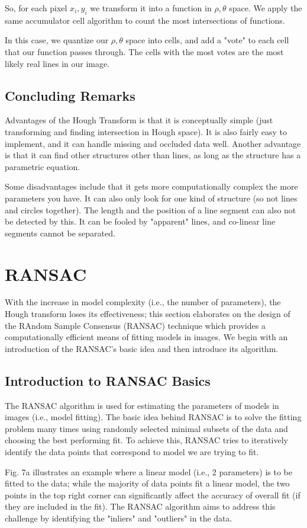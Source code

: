 \documentclass{article}
\begin{document}
So, for each pixel $x_i, y_i$ we transform it into a function in  $\rho, \theta$ space. We apply the same accumulator cell algorithm to count the most intersections of functions.

In this case, we quantize our $\rho, \theta$ space into cells, and add a "vote" to each cell that our function passes through. The cells with the most votes are the most likely real lines in our image.

\subsection{Concluding Remarks}
Advantages of the Hough Transform is that it is conceptually simple (just transforming and finding intersection in Hough space). It is also fairly easy to implement, and it can handle missing and occluded data well. Another advantage is that it can find other structures other than lines, as long as the structure has a parametric equation.

Some disadvantages include that it gets more computationally complex the more parameters you have. It can also only look for one kind of structure (so not lines and circles together). The length and the position of a line segment can also not be detected by this. It can be fooled by "apparent" lines, and co-linear line segments cannot be separated.
\section{RANSAC}
With the increase in model complexity (i.e., the number of parameters), the Hough transform loses its effectiveness; this section elaborates on the design of the RAndom Sample Consensus (RANSAC) technique \cite{fischler1981random} which provides a computationally efficient means of fitting models in images. We begin with an introduction of the RANSAC's basic idea and then introduce its algorithm.
\subsection{Introduction to RANSAC Basics}
The RANSAC algorithm is used for estimating the parameters of models in images (i.e., model fitting). The basic idea behind RANSAC is to solve the fitting problem many times using randomly selected minimal subsets of the data and choosing the best performing fit. To achieve this, RANSAC tries to iteratively identify the data points that correspond to model we are trying to fit.

Fig. 7a illustrates an example where a linear model (i.e., 2 parameters) is to be fitted to the data; while the majority of data points fit a linear model, the two points in the top right corner can significantly affect the accuracy of overall fit (if they are included in the fit). The RANSAC algorithm aims to address this challenge by identifying the "inliers" and "outliers" in the data.
\end{document}
